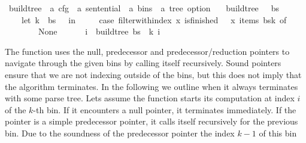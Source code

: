 \begin{isabellebody}
\isamarkupfalse%
\ build{\isacharunderscore}{\kern0pt}tree\ {\isacharcolon}{\kern0pt}{\isacharcolon}{\kern0pt}\ {\isachardoublequoteopen}{\isacharprime}{\kern0pt}a\ cfg\ {\isasymRightarrow}\ {\isacharprime}{\kern0pt}a\ sentential\ {\isasymRightarrow}\ {\isacharprime}{\kern0pt}a\ bins\ {\isasymRightarrow}\ {\isacharprime}{\kern0pt}a\ tree\ option{\isachardoublequoteclose}\ \isanewline
\ \ {\isachardoublequoteopen}build{\isacharunderscore}{\kern0pt}tree\ {\isasymG}\ {\isasymomega}\ bs\ {\isasymequiv}\isanewline
\ \ \ \ let\ k\ {\isacharequal}{\kern0pt}\ {\isacharbar}{\kern0pt}bs{\isacharbar}{\kern0pt}\ {\isacharminus}{\kern0pt}\ {}\ in\ {\isacharparenleft}{\kern0pt}\isanewline
\ \ \ \ case\ filter{\isacharunderscore}{\kern0pt}with{\isacharunderscore}{\kern0pt}index\ {\isacharparenleft}{\kern0pt}{\isasymlambda}x{\isachardot}{\kern0pt}\ is{\isacharunderscore}{\kern0pt}finished\ {\isasymG}\ {\isasymomega}\ x{\isacharparenright}{\kern0pt}\ {\isacharparenleft}{\kern0pt}items\ {\isacharparenleft}{\kern0pt}bs{\isacharbang}{\kern0pt}k{\isacharparenright}{\kern0pt}{\isacharparenright}{\kern0pt}\ of\isanewline
\ \ \ \ \ \ {\isacharbrackleft}{\kern0pt}{\isacharbrackright}{\kern0pt}\ {\isasymRightarrow}\ None\isanewline
\ \ \ \ {\isacharbar}{\kern0pt}\ {\isacharparenleft}{\kern0pt}{\isacharunderscore}{\kern0pt}{\isacharcomma}{\kern0pt}\ i{\isacharparenright}{\kern0pt}{\isacharhash}{\kern0pt}{\isacharunderscore}{\kern0pt}\ {\isasymRightarrow}\ build{\isacharunderscore}{\kern0pt}tree{\isacharprime}{\kern0pt}\ bs\ {\isasymomega}\ k\ i{\isacharparenright}{\kern0pt}{\isachardoublequoteclose}%
\isadelimdocument
%
\endisadelimdocument
%
\isatagdocument
%
\isamarkuptrue%
%
\endisatagdocument
{\isafolddocument}%
%
\isadelimdocument
%
\endisadelimdocument
%
\begin{isamarkuptext}%
The function  uses the null, predecessor and predecessor/reduction pointers to
navigate through the given bins by calling itself recursively. Sound pointers ensure that we are not
indexing outside of the bins, but this does not imply that the algorithm terminates. In the following
we outline when it always terminates with some parse tree. Lets assume the
function starts its computation at index $i$ of the $k$-th bin. If it encounters a null pointer, it
terminates immediately. If the pointer is a simple predecessor pointer, it calls itself recursively
for the previous bin. Due to the soundness of the predecessor pointer the index $k-1$ of this bin

\end{isamarkuptext}
\end{isabellebody}
